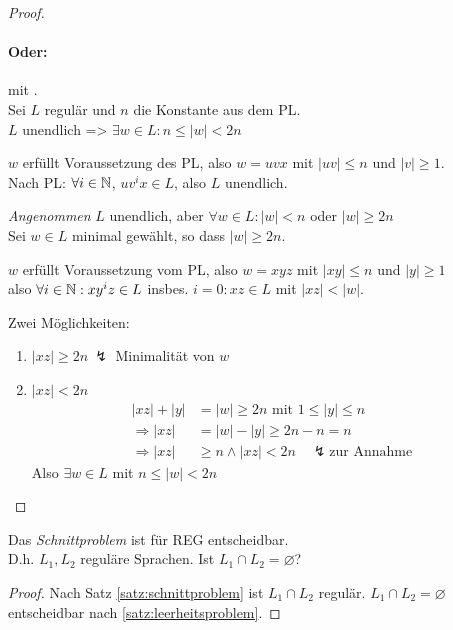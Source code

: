 {\begin{proof}
	\paragraph*{Oder:} mit .\\
	Sei $L$ regulär und $n$ die Konstante aus dem \ac{PL}.\\
	$L$ unendlich \<=> $\exists w\in L : n\leq |w| <2n$
	\begin{description}[font=\normalfont,labelwidth=\widthof{"'\<="':},leftmargin=!]
	\item["'\<="':] $w$ erfüllt Voraussetzung des \ac{PL}, also $w=uvx$ mit $|uv|\leq n$ und $|v|\geq 1$.\\
		Nach \ac{PL}: $\forall i\in\mathbb{N}$, $uv^ix\in L$, also $L$ unendlich.
	\item["'\=>"'] \emph{Angenommen} $L$ unendlich, aber $\forall w\in L : |w|<n$ oder $|w|\geq 2 n$\\
	Sei $w\in L$ minimal gewählt, so dass $|w|\geq 2n$.
	
	$w$ erfüllt Voraussetzung vom \ac{PL}, also $w=xyz$ mit $|xy|\leq n$ und $|y|\geq 1$\\
	also $\forall i\in\mathbb{N}: xy^iz\in L$ insbes. $i=0: xz\in L$ mit $|xz|<|w|$.
	
	Zwei Möglichkeiten:
	\begin{enumerate}[label=(\alph*)]
	\item $|xz|\geq 2n\ \lightning$ Minimalität von $w$
	\item $|xz|<2n$
		\begin{align*}
			|xz|+|y| &= |w|\geq 2n\text{ mit } 1\leq|y|\leq n\\ %
			\Rightarrow |xz| &= |w|-|y|\geq 2n-n=n \\
			\Rightarrow |xz| & \geq n \wedge |xz| < 2n \quad\lightning\text{zur Annahme}
		\end{align*}
		Also $\exists w\in L$ mit $n\leq|w|<2n$ \qedhere
	\end{enumerate}
	\end{description}
\end{proof}

\begin{Satz}[name={[Schnittproblem]}]\label{satz:schnittproblem}
        Das \emph{Schnittproblem} ist für REG entscheidbar.\\
        D.h. $L_1,L_2$ reguläre Sprachen. Ist $L_1\cap L_2 = \varnothing$?
\end{Satz}
\begin{proof}
        Nach Satz \ref{satz:schnittproblem} ist $L_1\cap L_2$ regulär. $L_1\cap L_2=\varnothing$ entscheidbar nach \autoref{satz:leerheitsproblem}.
\end{proof}

}
